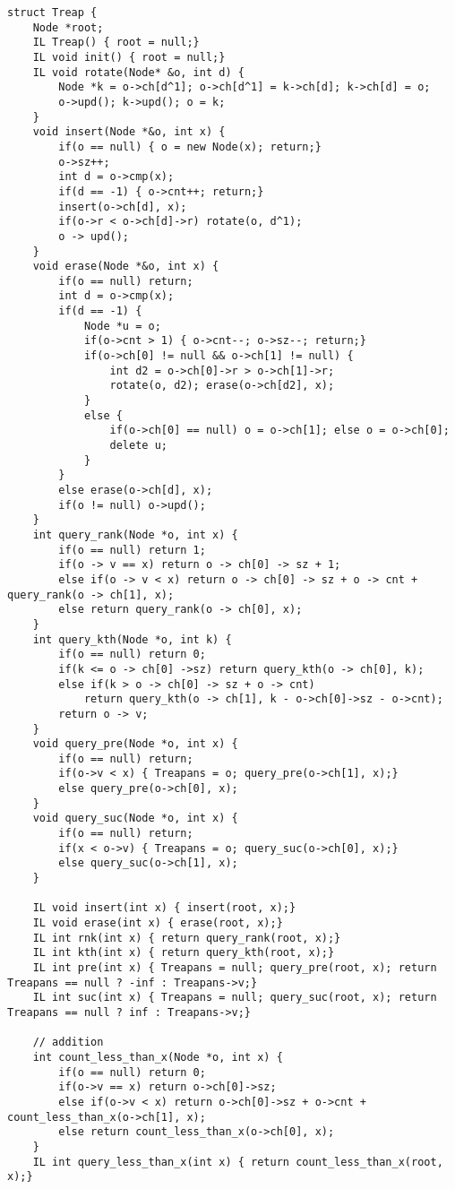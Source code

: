 \documentclass[UTF8]{ctexart}
\begin{document}
\begin{framed}
\begin{lstlisting}
struct Treap {
    Node *root;
    IL Treap() { root = null;}
    IL void init() { root = null;}
    IL void rotate(Node* &o, int d) {
        Node *k = o->ch[d^1]; o->ch[d^1] = k->ch[d]; k->ch[d] = o;
        o->upd(); k->upd(); o = k;
    }
    void insert(Node *&o, int x) {
        if(o == null) { o = new Node(x); return;}
        o->sz++;
        int d = o->cmp(x);
        if(d == -1) { o->cnt++; return;}
        insert(o->ch[d], x);
        if(o->r < o->ch[d]->r) rotate(o, d^1);
        o -> upd();
    }
    void erase(Node *&o, int x) {
        if(o == null) return;
        int d = o->cmp(x);
        if(d == -1) {
            Node *u = o;
            if(o->cnt > 1) { o->cnt--; o->sz--; return;}
            if(o->ch[0] != null && o->ch[1] != null) {
                int d2 = o->ch[0]->r > o->ch[1]->r;
                rotate(o, d2); erase(o->ch[d2], x);
            }
            else {
                if(o->ch[0] == null) o = o->ch[1]; else o = o->ch[0];
                delete u;
            }
        }
        else erase(o->ch[d], x);
        if(o != null) o->upd();
    }
    int query_rank(Node *o, int x) {
        if(o == null) return 1;
        if(o -> v == x) return o -> ch[0] -> sz + 1;
        else if(o -> v < x) return o -> ch[0] -> sz + o -> cnt + query_rank(o -> ch[1], x);
        else return query_rank(o -> ch[0], x);
    }
    int query_kth(Node *o, int k) {
        if(o == null) return 0;
        if(k <= o -> ch[0] ->sz) return query_kth(o -> ch[0], k);
        else if(k > o -> ch[0] -> sz + o -> cnt) 
            return query_kth(o -> ch[1], k - o->ch[0]->sz - o->cnt);
        return o -> v;
    }
    void query_pre(Node *o, int x) {
        if(o == null) return;
        if(o->v < x) { Treapans = o; query_pre(o->ch[1], x);}
        else query_pre(o->ch[0], x);
    }
    void query_suc(Node *o, int x) {
        if(o == null) return;
        if(x < o->v) { Treapans = o; query_suc(o->ch[0], x);}
        else query_suc(o->ch[1], x);
    }

    IL void insert(int x) { insert(root, x);}
    IL void erase(int x) { erase(root, x);}
    IL int rnk(int x) { return query_rank(root, x);}
    IL int kth(int x) { return query_kth(root, x);}
    IL int pre(int x) { Treapans = null; query_pre(root, x); return Treapans == null ? -inf : Treapans->v;}
    IL int suc(int x) { Treapans = null; query_suc(root, x); return Treapans == null ? inf : Treapans->v;}

    // addition
    int count_less_than_x(Node *o, int x) {
        if(o == null) return 0;
        if(o->v == x) return o->ch[0]->sz;
        else if(o->v < x) return o->ch[0]->sz + o->cnt + count_less_than_x(o->ch[1], x);
        else return count_less_than_x(o->ch[0], x);
    }
    IL int query_less_than_x(int x) { return count_less_than_x(root, x);}


\end{lstlisting}
\end{framed}
\end{document}
